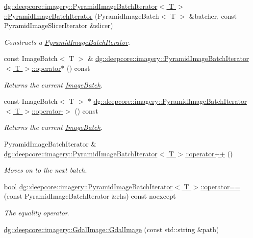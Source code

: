 \begin{DoxyCompactItemize}
\hyperlink{group___imagery_module_gafaa065adfee60c6db16f2c398c438400}{dg\+::deepcore\+::imagery\+::\+Pyramid\+Image\+Batch\+Iterator$<$ T $>$\+::\+Pyramid\+Image\+Batch\+Iterator} (Pyramid\+Image\+Batch$<$ T $>$ \&batcher, const Pyramid\+Image\+Slicer\+Iterator \&slicer)
\begin{DoxyCompactList}\small\item\em Constructs a \hyperlink{classdg_1_1deepcore_1_1imagery_1_1_pyramid_image_batch_iterator}{Pyramid\+Image\+Batch\+Iterator}. \end{DoxyCompactList}\item 
const Image\+Batch$<$ T $>$ \& \hyperlink{group___imagery_module_gac21ea85be8311510322c9fdd5c9ebe50}{dg\+::deepcore\+::imagery\+::\+Pyramid\+Image\+Batch\+Iterator$<$ T $>$\+::operator$\ast$} () const 
\begin{DoxyCompactList}\small\item\em Returns the current \hyperlink{classdg_1_1deepcore_1_1imagery_1_1_image_batch}{Image\+Batch}. \end{DoxyCompactList}\item 
const Image\+Batch$<$ T $>$ $\ast$ \hyperlink{group___imagery_module_gaccd917f1703532af22119b69f9f87acc}{dg\+::deepcore\+::imagery\+::\+Pyramid\+Image\+Batch\+Iterator$<$ T $>$\+::operator-\/$>$} () const 
\begin{DoxyCompactList}\small\item\em Returns the current \hyperlink{classdg_1_1deepcore_1_1imagery_1_1_image_batch}{Image\+Batch}. \end{DoxyCompactList}\item 
Pyramid\+Image\+Batch\+Iterator \& \hyperlink{group___imagery_module_ga8a830889046c718cbfcb4067a33908f3}{dg\+::deepcore\+::imagery\+::\+Pyramid\+Image\+Batch\+Iterator$<$ T $>$\+::operator++} ()
\begin{DoxyCompactList}\small\item\em Moves on to the next batch. \end{DoxyCompactList}\item 
bool \hyperlink{group___imagery_module_ga6ebbb4ad321f8a6fff0423155a784e3c}{dg\+::deepcore\+::imagery\+::\+Pyramid\+Image\+Batch\+Iterator$<$ T $>$\+::operator==} (const Pyramid\+Image\+Batch\+Iterator \&rhs) const noexcept
\begin{DoxyCompactList}\small\item\em The equality operator. \end{DoxyCompactList}\item 
\hyperlink{group___imagery_module_ga2c05530c01c9cc6bf0d0f332b74cecc3}{dg\+::deepcore\+::imagery\+::\+Gdal\+Image\+::\+Gdal\+Image} (const std\+::string \&path)

\end{DoxyCompactItemize}
